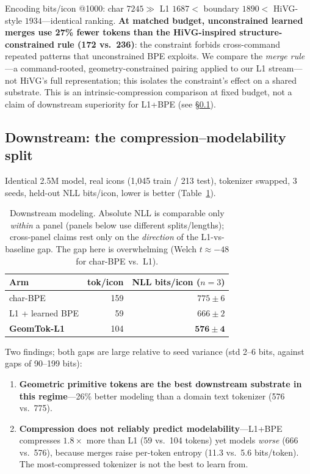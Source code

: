 \documentclass[11pt]{article}
\begin{document}
Encoding bits/icon @1000: char $7245 \gg$ L1 $1687 <$ boundary $1890 <$ HiVG-style $1934$---identical ranking. \textbf{At matched budget, unconstrained learned merges use 27\% fewer tokens than the HiVG-inspired structure-constrained rule (172 vs.\ 236)}: the constraint forbids cross-command repeated patterns that unconstrained BPE exploits. We compare the \emph{merge rule}---a command-rooted, geometry-constrained pairing applied to our L1 stream---not HiVG's full representation; this isolates the constraint's effect on a shared substrate. This is an intrinsic-compression comparison at fixed budget, not a claim of downstream superiority for L1+BPE (see \S\ref{sec:downstream}).

\subsection{Downstream: the compression--modelability split}
\label{sec:downstream}
Identical 2.5M model, real icons (1{,}045 train / 213 test), tokenizer swapped, 3 seeds, held-out NLL bits/icon, lower is better (Table~\ref{tab:downstream}).

\begin{table}[t]
\centering
\small
\begin{tabular}{lrr}
\toprule
Arm & tok/icon & NLL bits/icon ($n{=}3$) \\
\midrule
char-BPE & 159 & $775\pm6$ \\
L1 + learned BPE & 59 & $666\pm2$ \\
\textbf{GeomTok-L1} & 104 & $\mathbf{576\pm4}$ \\
\bottomrule
\end{tabular}
\caption{Downstream modeling. Absolute NLL is comparable only \emph{within} a panel (panels below use different splits/lengths); cross-panel claims rest only on the \emph{direction} of the L1-vs-baseline gap. The gap here is overwhelming (Welch $t\approx-48$ for char-BPE vs.\ L1).}
\label{tab:downstream}
\end{table}

Two findings; both gaps are large relative to seed variance (std 2--6 bits, against gaps of 90--199 bits):
\begin{enumerate}
\item \textbf{Geometric primitive tokens are the best downstream substrate in this regime}---26\% better modeling than a domain text tokenizer (576 vs.\ 775).
\item \textbf{Compression does not reliably predict modelability}---L1+BPE compresses $1.8\times$ more than L1 (59 vs.\ 104 tokens) yet models \emph{worse} (666 vs.\ 576), because merges raise per-token entropy (11.3 vs.\ 5.6 bits/token). The most-compressed tokenizer is not the best to learn from.
\end{enumerate}
\end{document}
